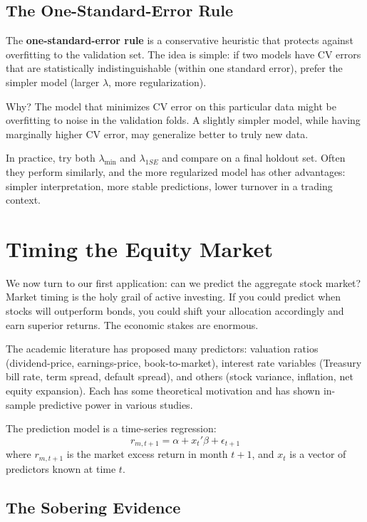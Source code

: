 \documentclass[11pt,a4paper]{article}
\newcommand{\keyword}[1]{\textbf{\textcolor{AccentOrange}{#1}}}
\begin{document}
\subsection{The One-Standard-Error Rule}

The \keyword{one-standard-error rule} is a conservative heuristic that protects against overfitting to the validation set. The idea is simple: if two models have CV errors that are statistically indistinguishable (within one standard error), prefer the simpler model (larger $\lambda$, more regularization).

Why? The model that minimizes CV error on this particular data might be overfitting to noise in the validation folds. A slightly simpler model, while having marginally higher CV error, may generalize better to truly new data.

In practice, try both $\lambda_{\min}$ and $\lambda_{1SE}$ and compare on a final holdout set. Often they perform similarly, and the more regularized model has other advantages: simpler interpretation, more stable predictions, lower turnover in a trading context.

\section{Timing the Equity Market}

We now turn to our first application: can we predict the aggregate stock market? Market timing is the holy grail of active investing. If you could predict when stocks will outperform bonds, you could shift your allocation accordingly and earn superior returns. The economic stakes are enormous.

The academic literature has proposed many predictors: valuation ratios (dividend-price, earnings-price, book-to-market), interest rate variables (Treasury bill rate, term spread, default spread), and others (stock variance, inflation, net equity expansion). Each has some theoretical motivation and has shown in-sample predictive power in various studies.

The prediction model is a time-series regression:
\[
r_{m,t+1} = \alpha + x_t'\beta + \epsilon_{t+1}
\]
where $r_{m,t+1}$ is the market excess return in month $t+1$, and $x_t$ is a vector of predictors known at time $t$.

\subsection{The Sobering Evidence}
\end{document}
